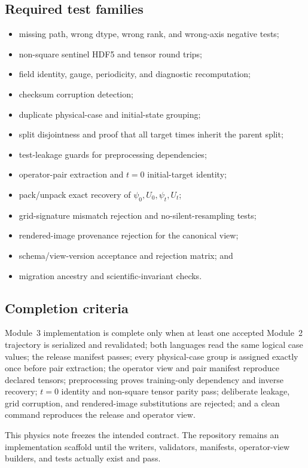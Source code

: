 \documentclass[11pt]{article}
\begin{document}
\subsection{Required test families}
\begin{itemize}
  \item missing path, wrong dtype, wrong rank, and wrong-axis negative tests;
  \item non-square sentinel HDF5 and tensor round trips;
  \item field identity, gauge, periodicity, and diagnostic recomputation;
  \item checksum corruption detection;
  \item duplicate physical-case and initial-state grouping;
  \item split disjointness and proof that all target times inherit the parent split;
  \item test-leakage guards for preprocessing dependencies;
  \item operator-pair extraction and $t=0$ initial-target identity;
  \item pack/unpack exact recovery of $\psi_0,U_0,\psi_t,U_t$;
  \item grid-signature mismatch rejection and no-silent-resampling tests;
  \item rendered-image provenance rejection for the canonical view;
  \item schema/view-version acceptance and rejection matrix; and
  \item migration ancestry and scientific-invariant checks.
\end{itemize}

\subsection{Completion criteria}
Module~3 implementation is complete only when at least one accepted Module~2 trajectory is serialized and revalidated; both languages read the same logical case values; the release manifest passes; every physical-case group is assigned exactly once before pair extraction; the operator view and pair manifest reproduce declared tensors; preprocessing proves training-only dependency and inverse recovery; $t=0$ identity and non-square tensor parity pass; deliberate leakage, grid corruption, and rendered-image substitutions are rejected; and a clean command reproduces the release and operator view.

\begin{warningbox}
This physics note freezes the intended contract. The repository remains an implementation scaffold until the writers, validators, manifests, operator-view builders, and tests actually exist and pass.
\end{warningbox}
\end{document}
